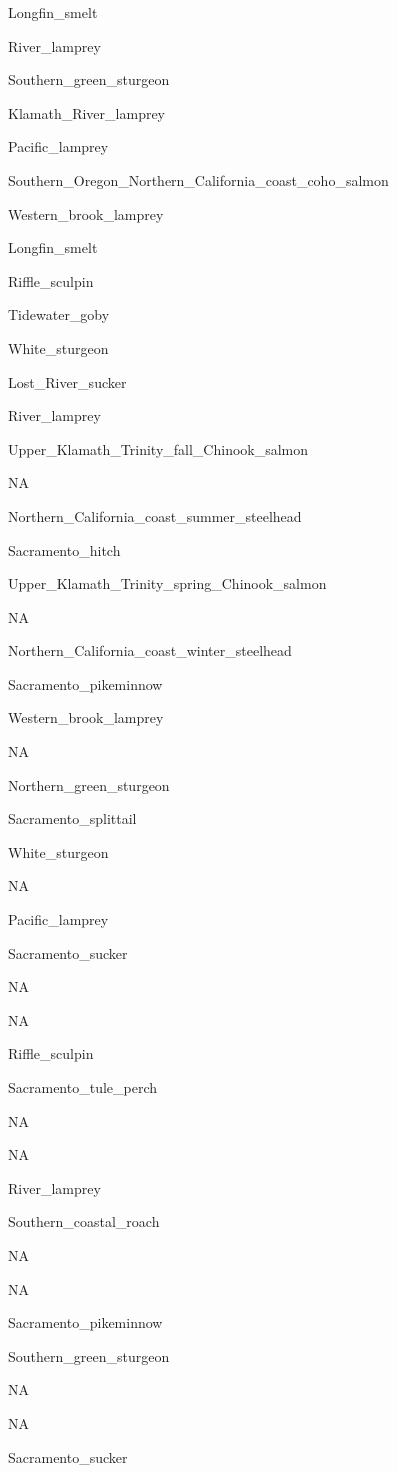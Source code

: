 \documentclass[]{article}
\begin{document}
Longfin\_smelt

River\_lamprey

Southern\_green\_sturgeon

Klamath\_River\_lamprey

Pacific\_lamprey

Southern\_Oregon\_Northern\_California\_coast\_coho\_salmon

Western\_brook\_lamprey

Longfin\_smelt

Riffle\_sculpin

Tidewater\_goby

White\_sturgeon

Lost\_River\_sucker

River\_lamprey

Upper\_Klamath\_Trinity\_fall\_Chinook\_salmon

NA

Northern\_California\_coast\_summer\_steelhead

Sacramento\_hitch

Upper\_Klamath\_Trinity\_spring\_Chinook\_salmon

NA

Northern\_California\_coast\_winter\_steelhead

Sacramento\_pikeminnow

Western\_brook\_lamprey

NA

Northern\_green\_sturgeon

Sacramento\_splittail

White\_sturgeon

NA

Pacific\_lamprey

Sacramento\_sucker

NA

NA

Riffle\_sculpin

Sacramento\_tule\_perch

NA

NA

River\_lamprey

Southern\_coastal\_roach

NA

NA

Sacramento\_pikeminnow

Southern\_green\_sturgeon

NA

NA

Sacramento\_sucker
\end{document}
